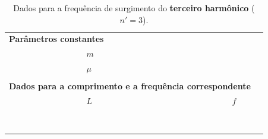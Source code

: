 \begin{table}[!htb]
\forceversofloat
\caption{Dados para a frequência de surgimento do \textbf{terceiro harmônico} ($n' = 3$).}
\label{Tab:FrequenciaFuncaoComprimento3}
	\begin{center}
		\begin{tabular}{cp{45mm}p{45mm}c}
		\toprule
\multicolumn{2}{l}{\textbf{Parâmetros constantes}}&\\
		\cmidrule{2-3}
		& \cellcolor[gray]{0.89}$m$ &\cellcolor[gray]{0.92} \\
		& \cellcolor[gray]{0.95}$\mu$ & \cellcolor[gray]{0.97}\\
		\cmidrule{2-3}
		\\
\multicolumn{3}{l}{\textbf{Dados para a comprimento e a frequência correspondente}} \\
		\cmidrule{2-3}		
		& $L$ & $f$ &\\
		\cmidrule{2-3}
		& \cellcolor[gray]{0.89} & \cellcolor[gray]{0.92} \\
		& \cellcolor[gray]{0.95} & \cellcolor[gray]{0.97} \\
		& \cellcolor[gray]{0.89} & \cellcolor[gray]{0.92} \\
		& \cellcolor[gray]{0.95} & \cellcolor[gray]{0.97} \\
		& \cellcolor[gray]{0.89} & \cellcolor[gray]{0.92} \\
		& \cellcolor[gray]{0.95} & \cellcolor[gray]{0.97} \\
		& \cellcolor[gray]{0.89} & \cellcolor[gray]{0.92} \\
		& \cellcolor[gray]{0.95} & \cellcolor[gray]{0.97} \\
		\cmidrule{2-3}
		\bottomrule
		\end{tabular}
	\end{center}
\end{table}

